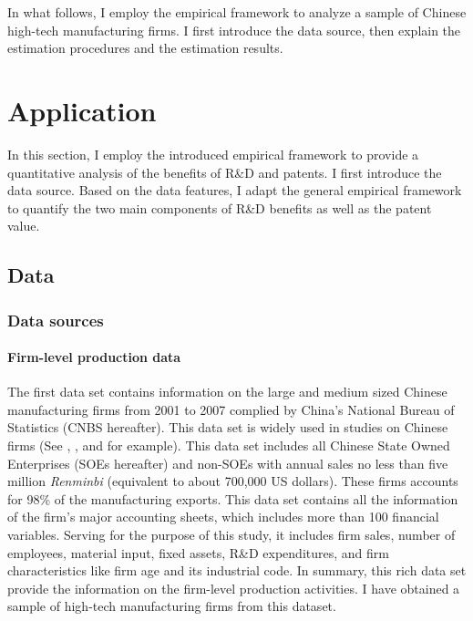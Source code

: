 \documentclass[English]{article}
\begin{document}
In what follows, I employ the empirical framework to analyze a sample of Chinese high-tech manufacturing firms. I first introduce the data source, then explain the estimation procedures and the estimation results. 

\section{Application}
In this section, I employ the introduced empirical framework to provide a quantitative analysis of the benefits of R\&D and patents. I first introduce the data source. Based on the data features, I adapt the general empirical framework to quantify the two main components of R\&D benefits as well as the patent value. 

\subsection{Data}
\subsubsection{Data sources}
\paragraph{Firm-level production data}
The first data set contains information on the large and medium sized Chinese manufacturing firms from 2001 to 2007 complied by China's National Bureau of Statistics (CNBS
hereafter). This data set is widely used in studies on Chinese firms (See \citet{HsiehKlenow}, \citet*{song2011}, and \citet*{BRANDT2012339} for example).
This data set includes all Chinese State Owned Enterprises (SOEs hereafter)
and non-SOEs with annual sales no less than five million \textit{Renminbi}
(equivalent to about 700,000 US dollars). These firms accounts for
98\% of the manufacturing exports. This data set contains all the
information of the firm's major accounting sheets, which includes
more than 100 financial variables. Serving for the purpose of this study, it includes firm
sales, number of employees, material input, fixed assets, R\&D expenditures,
and firm characteristics like firm age and its industrial code. In
summary, this rich data set provide the information on the firm-level
production activities. I have obtained a sample of high-tech manufacturing firms from this dataset. 
\end{document}
